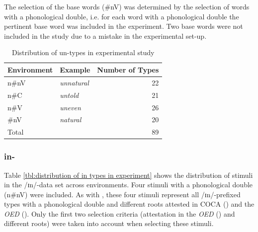 The selection of the base words ({\#nV}) was determined by the selection of words with a phonological double, i.e.  for each word with a phonological double the pertinent base word was included in the experiment. Two base words were not included in the study due to a mistake in the experimental set-up. 





\begin{table}[H]
	\caption{Distribution of  {un}-types in experimental study}
	\label{tbl:distribution of un types in experiment}

	\begin{center}
		\begin{tabular} {llr}

			Environment & Example & Number of  Types\\

			\hline
			n\#nV&\color[HTML]{3166FF}\textit{unnatural} & 22\\ 
			n\#C&\color[HTML]{3166FF}\textit{untold} & 21\\ 
			n\#V&\color[HTML]{3166FF}\textit{uneven} & 26 \\
			\#nV&\color[HTML]{3166FF}\textit{natural} & 20 \\ 
			\hline
			Total&  & 89 \\ 
			\hline

		\end{tabular}
		

	\end{center}
\end{table}



\subsubsection{in-}

Table \ref{tbl:distribution of in types in experiment} shows the distribution of  stimuli in the /ɪn/-data set across environments. 
Four stimuli with a phonological double ({n\#nV}) were included. As with , these four stimuli represent all /ɪn/-prefixed types with a phonological double and different roots attested in COCA (\citealt{Davies.20082014}) and the \textit{OED} (\citealt{OED.2013}). Only the first two selection criteria (attestation in the \textit{OED} (\citealt{OED.2013}) and different roots) were taken into account when selecting these stimuli. 

\clearpage

